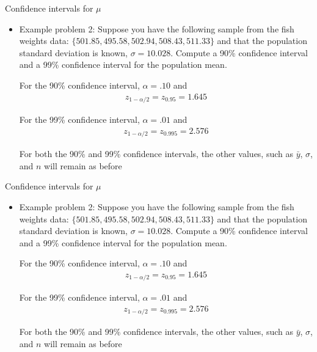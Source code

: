 \documentclass[xcolor=dvipsnames]{beamer}
\begin{document}
\begin{frame}{Confidence intervals for $\mu$}
	\begin{itemize}
		\item Example problem 2: Suppose you have the following sample from the fish weights data: $\{501.85, 495.58, 502.94, 508.43, 511.33 \}$ and that the population standard deviation is known, $\sigma = 10.028$. Compute a 90\% confidence interval and a 99\% confidence interval for the population mean.\\  \vspace{10pt}
		
		For the 90\% confidence interval, $\alpha = .10$ and 
		\begin{gather*}
			z_{1-\alpha / 2} = z_{0.95} = 1.645
		\end{gather*}
		
		For the 99\% confidence interval, $\alpha = .01$ and 
		\begin{gather*}
		z_{1-\alpha / 2} = z_{0.995} = 2.576
		\end{gather*}
		
		For both the 90\% and 99\% confidence intervals, the other values, such as $\bar{y}$, $\sigma$, and $n$ will remain as before
	\end{itemize}
\end{frame}

\begin{frame}{Confidence intervals for $\mu$}
	\begin{itemize}
		\item Example problem 2: Suppose you have the following sample from the fish weights data: $\{501.85, 495.58, 502.94, 508.43, 511.33 \}$ and that the population standard deviation is known, $\sigma = 10.028$. Compute a 90\% confidence interval and a 99\% confidence interval for the population mean.\\  \vspace{10pt}
		
		For the 90\% confidence interval, $\alpha = .10$ and 
		\begin{gather*}
		z_{1-\alpha / 2} = z_{0.95} = 1.645
		\end{gather*}
		
		For the 99\% confidence interval, $\alpha = .01$ and 
		\begin{gather*}
		z_{1-\alpha / 2} = z_{0.995} = 2.576
		\end{gather*}
		
		For both the 90\% and 99\% confidence intervals, the other values, such as $\bar{y}$, $\sigma$, and $n$ will remain as before
	\end{itemize}
\end{frame}
\end{document}

